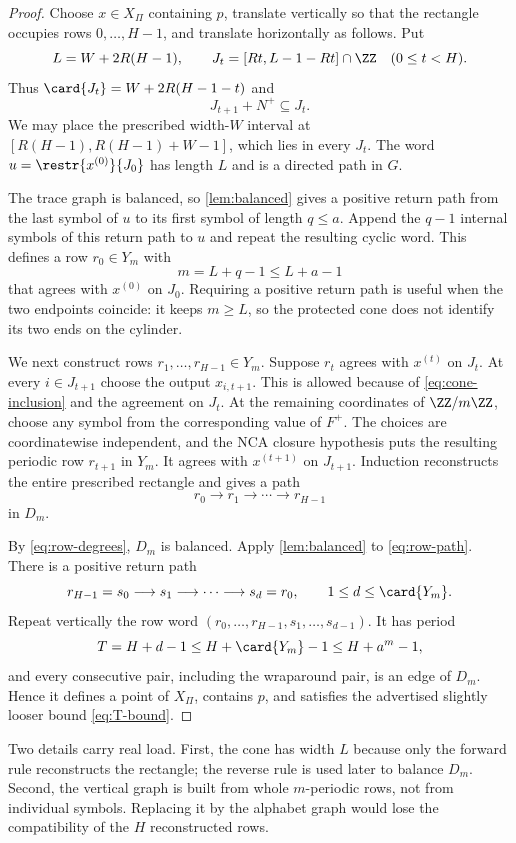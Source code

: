 \begin{proof}
Choose $x\in X_\Pi$ containing $p$, translate vertically so that the rectangle occupies rows $0,\ldots,H-1$, and translate horizontally as follows.  Put
\[
 L=W+2R(H-1),
 \qquad
 J_t=[Rt,L-1-Rt]\cap\ZZ \quad(0\leq t<H).
\]
Thus $\card{J_t}=W+2R(H-1-t)$ and
\begin{equation}\label{eq:cone-inclusion}
 J_{t+1}+N^+\subseteq J_t.
\end{equation}
We may place the prescribed width-$W$ interval at
$[R(H-1),R(H-1)+W-1]$, which lies in every $J_t$.  The word
$u=\restr{x^{(0)}}{J_0}$ has length $L$ and is a directed path in $G$.

The trace graph is balanced, so \cref{lem:balanced} gives a positive return path from the last symbol of $u$ to its first symbol of length
$q\leq a$.  Append the $q-1$ internal symbols of this return path to $u$ and repeat the resulting cyclic word.  This defines a row
$r_0\in Y_m$ with
\begin{equation}\label{eq:horizontal-period}
 m=L+q-1\leq L+a-1
\end{equation}
that agrees with $x^{(0)}$ on $J_0$.  Requiring a positive return path is useful when the two endpoints coincide: it keeps $m\geq L$, so the protected cone does not identify its two ends on the cylinder.

We next construct rows $r_1,\ldots,r_{H-1}\in Y_m$.  Suppose
$r_t$ agrees with $x^{(t)}$ on $J_t$.  At every $i\in J_{t+1}$ choose
the output $x_{i,t+1}$.  This is allowed because of
\eqref{eq:cone-inclusion} and the agreement on $J_t$.  At the remaining coordinates of $\ZZ/m\ZZ$, choose any symbol from the corresponding value of $F^+$.  The choices are coordinatewise independent, and the NCA closure hypothesis puts the resulting periodic row $r_{t+1}$ in $Y_m$.  It agrees with $x^{(t+1)}$ on $J_{t+1}$.  Induction reconstructs the entire prescribed rectangle and gives a path
\begin{equation}\label{eq:row-path}
 r_0\longrightarrow r_1\longrightarrow\cdots\longrightarrow r_{H-1}
\end{equation}
in $D_m$.

By \eqref{eq:row-degrees}, $D_m$ is balanced.  Apply
\cref{lem:balanced} to \eqref{eq:row-path}.  There is a positive return path
\[
 r_{H-1}=s_0\longrightarrow s_1\longrightarrow\cdots
 \longrightarrow s_d=r_0,
 \qquad 1\leq d\leq\card{Y_m}.
\]
Repeat vertically the row word
$(r_0,\ldots,r_{H-1},s_1,\ldots,s_{d-1})$.  It has period
\[
 T=H+d-1\leq H+\card{Y_m}-1\leq H+a^m-1,
\]
and every consecutive pair, including the wraparound pair, is an edge of
$D_m$.  Hence it defines a point of $X_\Pi$, contains $p$, and satisfies the advertised slightly looser bound \eqref{eq:T-bound}.
\end{proof}

Two details carry real load.  First, the cone has width $L$ because only the forward rule reconstructs the rectangle; the reverse rule is used later to balance $D_m$.  Second, the vertical graph is built from whole $m$-periodic rows, not from individual symbols.  Replacing it by the alphabet graph would lose the compatibility of the $H$ reconstructed rows.
